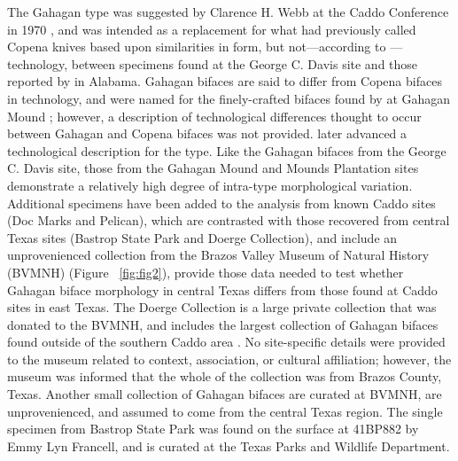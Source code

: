 \documentclass[review]{elsarticle}
\begin{document}
The Gahagan type was suggested by Clarence H. Webb at the Caddo Conference in 1970 \citep{RN3684}, and was intended as a replacement for what \cite{RN800} had previously called Copena knives based upon similarities in form, but not---according to \cite{RN3684}---technology, between specimens found at the George C. Davis site and those reported by \cite{RN11562} in Alabama. Gahagan bifaces are said to differ from Copena bifaces in technology, and were named for the finely-crafted bifaces found by \cite{RN2740} at Gahagan Mound \citep{RN3684}; however, a description of technological differences thought to occur between Gahagan and Copena bifaces was not provided. \citet[22]{RN4924} later advanced a technological description for the type. Like the Gahagan bifaces from the George C. Davis site, those from the Gahagan Mound and Mounds Plantation sites demonstrate a relatively high degree of intra-type morphological variation. Additional specimens have been added to the analysis from known Caddo sites (Doc Marks and Pelican), which are contrasted with those recovered from central Texas sites (Bastrop State Park and Doerge Collection), and include an unprovenienced collection from the Brazos Valley Museum of Natural History (BVMNH) (Figure ~\ref{fig:fig2}), provide those data needed to test whether Gahagan biface morphology in central Texas differs from those found at Caddo sites in east Texas. The Doerge Collection is a large private collection that was donated to the BVMNH, and includes the largest collection of Gahagan bifaces found outside of the southern Caddo area \citep[Table 5]{RN4924}. No site-specific details were provided to the museum related to context, association, or cultural affiliation; however, the museum was informed that the whole of the collection was from Brazos County, Texas. Another small collection of Gahagan bifaces are curated at BVMNH, are unprovenienced, and assumed to come from the central Texas region. The single specimen from Bastrop State Park was found on the surface at 41BP882 by Emmy Lyn Francell, and is curated at the Texas Parks and Wildlife Department.
\end{document}
